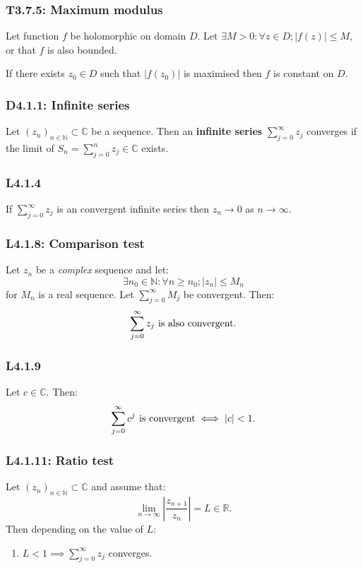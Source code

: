 \documentclass{article}
\begin{document}
\begin{multicols*}{3}
\subsubsection*{T3.7.5: Maximum modulus}
Let function $f$ be holomorphic on domain $D$.
Let $\exists M>0:\forall z\in D; |f(z)|\leq M$, or that
$f$ is also bounded.

If there exists $z_0\in D$
such that $|f(z_0)|$ is maximised then $f$ is constant on $D$.

\subsubsection*{D4.1.1: Infinite series}
Let $(z_n)_{n\in\mathbb{N}}\subset\mathbb{C}$ be a sequence. Then an
\textbf{infinite series} $\sum_{j=0}^{\infty}z_j$ converges if the
limit of $S_n=\sum_{j=0}^{n}z_j\in\mathbb{C}$ exists.

\subsubsection*{L4.1.4}
If $\sum_{j=0}^{\infty}z_j$ is an convergent infinite series then
$z_n\rightarrow0$ as $n\rightarrow\infty$.

\subsubsection*{L4.1.8: Comparison test}
Let $z_n$ be a \textit{complex} sequence and let:
$$\exists n_0\in\mathbb{N}:\forall n\geq n_0;|z_n|\leq M_n$$
for $M_n$ is a real sequence.
Let $\sum_{j=0}^{\infty}M_j$ be convergent. Then:
$$\sum_{j=0}^{\infty}z_j\hspace{0.05in}
\text{is also convergent.}$$

\subsubsection*{L4.1.9}
Let $c\in\mathbb{C}$. Then:
$$\sum_{j=0}^{\infty}c^j\hspace{0.05in}
\text{is convergent}\iff |c|<1.$$

\subsubsection*{L4.1.11: Ratio test}
Let $(z_n)_{n\in\mathbb{N}}\subset\mathbb{C}$ and assume that:
$$\lim_{n\rightarrow\infty}\left|\frac{z_{n+1}}{z_n}\right|
=L\in\mathbb{R}.$$
Then depending on the value of $L$:
\begin{enumerate}
    \item $L<1\implies\sum_{j=0}^{\infty}z_j$ converges.
    

\end{enumerate}
\end{multicols*}
\end{document}
